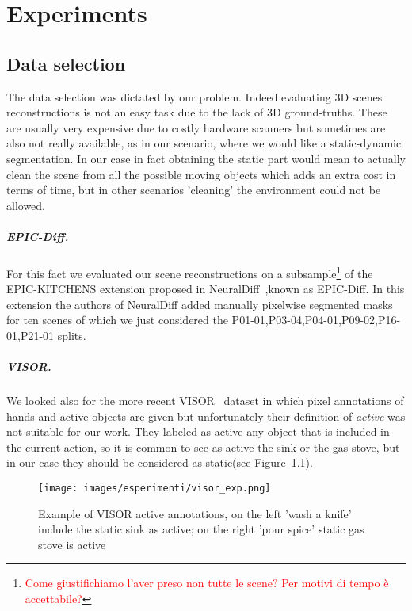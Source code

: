 \chapter{Experiments}
\section{Data selection}
The data selection was dictated by our problem. Indeed evaluating 3D scenes 
reconstructions is not an easy task due to the lack of 3D ground-truths. These
are usually very expensive due to costly hardware scanners but sometimes are 
also not really available, as in our scenario, where we would like a static-dynamic
segmentation. In our case in fact obtaining the static part would mean to 
actually clean the scene from all the possible moving objects which adds 
an extra cost in terms of time, but in other scenarios 'cleaning' the environment
could not be allowed.

\paragraph{EPIC-Diff.}For this fact we evaluated our scene reconstructions on a subsample\footnote{\textcolor{red}{Come giustifichiamo l'aver preso non tutte le scene? Per motivi di tempo è accettabile?}}
of the EPIC-KITCHENS extension proposed in NeuralDiff~\cite{neuraldiff},known as EPIC-Diff. In this extension
the authors of NeuralDiff added manually pixelwise segmented masks for ten scenes of which we just considered the 
P01-01,P03-04,P04-01,P09-02,P16-01,P21-01 splits.

\paragraph{VISOR.}We looked also for 
the more recent VISOR~\cite{visor} dataset in which pixel annotations of hands 
and active objects are given but unfortunately their definition of \textit{active}
was not suitable for our work. They labeled as active any object that is 
included in the current action, so it is common to see as active the sink or 
the gas stove, but in our case they should be considered as static(see Figure~\ref{fig:vis_exp}).

\begin{figure}[H]
    \centering
    \texttt{[image: images/esperimenti/visor\_exp.png]} 
    \caption{Example of VISOR active annotations, on the left 'wash a knife' include the
    static sink as active; on the right 'pour spice' static gas stove is active}\label{fig:vis_exp}
\end{figure}

